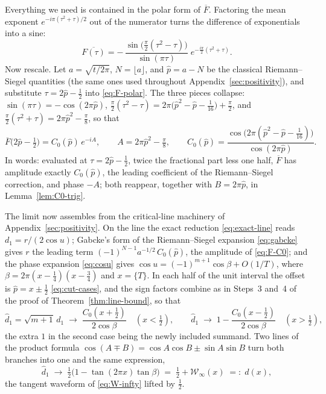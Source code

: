 \documentclass[11pt]{article}
\theoremstyle{definition}
\begin{document}
Everything we need is contained in the polar form of $\overline F$.
Factoring the
mean exponent $e^{-i\pi(\tau^{2}+\tau)/2}$ out of the numerator turns
the difference of exponentials into a sine:
\begin{equation}\label{eq:F-polar}
\overline{F(\tau)}
=-\,\frac{\sin\!\bigl(\tfrac{\pi}{2}(\tau^{2}-\tau)\bigr)}{\sin(\pi\tau)}\;
e^{-\tfrac{i\pi}{2}(\tau^{2}+\tau)} .
\end{equation}
Now rescale. Let $a=\sqrt{t/2\pi}$, $N=\lfloor a\rfloor$, and
$\hat p=a-N$ be the classical Riemann--Siegel quantities (the same ones
used throughout Appendix~\ref{sec:positivity}), and substitute
$\tau=2\hat p-\tfrac12$ into \eqref{eq:F-polar}. The three pieces
collapse: $\sin(\pi\tau)=-\cos(2\pi\hat p)$,
$\tfrac{\pi}{2}(\tau^{2}-\tau)=2\pi\bigl(\hat p^{2}-\hat p-\tfrac1{16}\bigr)
+\tfrac{\pi}{2}$, and
$\tfrac{\pi}{2}(\tau^{2}+\tau)=2\pi\hat p^{2}-\tfrac{\pi}{8}$, so that
\begin{equation}\label{eq:F-C0}
\overline{F}\bigl(2\hat p-\tfrac12\bigr)
= C_0(\hat p)\,e^{-iA},
\qquad
A=2\pi\hat p^{2}-\tfrac\pi8,
\qquad
C_0(\hat p)=\frac{\cos\!\bigl(2\pi(\hat p^{2}-\hat p-\tfrac1{16})\bigr)}
{\cos(2\pi\hat p)} .
\end{equation}
In words: evaluated at $\tau=2\hat p-\tfrac12$, twice the fractional
part less one half, $\overline F$ has amplitude exactly $C_0(\hat p)$, the
leading coefficient of the Riemann--Siegel correction, and phase $-A$;
both reappear, together with $B=2\pi\hat p$, in
Lemma~\ref{lem:C0-trig}.

The limit now assembles from the critical-line machinery of
Appendix~\ref{sec:positivity}. On the line the exact reduction
\eqref{eq:exact-line} reads $d_1=r/(2\cos u)$; Gabcke's form of the
Riemann--Siegel expansion \eqref{eq:gabcke} gives $r$ the leading term
$(-1)^{N-1}a^{-1/2}\,C_0(\hat p)$, the amplitude of \eqref{eq:F-C0}; and
the phase expansion \eqref{eq:cosu} gives
$\cos u=(-1)^{m+1}\cos\beta+O(1/T)$, where
$\beta=2\pi(x-\tfrac14)(x-\tfrac34)$ and $x=\{T\}$. In each half of the
unit interval the offset is $\hat p=x\pm\tfrac12$ \eqref{eq:cut-cases},
and the sign factors combine as in Steps~3 and~4 of the proof of
Theorem~\ref{thm:line-bound}, so that
\[
\hat d_1=\sqrt{m+1}\,d_1
\;\longrightarrow\;
\frac{C_0(x+\tfrac12)}{2\cos\beta}
\quad(x<\tfrac12),
\qquad
\hat d_1
\;\longrightarrow\;
1-\frac{C_0(x-\tfrac12)}{2\cos\beta}
\quad(x>\tfrac12),
\]
the extra $1$ in the second case being the newly included summand. Two
lines of the product formula
$\cos(A\mp B)=\cos A\cos B\pm\sin A\sin B$ turn both branches into one and
the same expression,
\[
\hat d_1
\;\longrightarrow\;
\tfrac12\bigl(1-\tan(2\pi x)\tan\beta\bigr)
\;=\;\tfrac12+\mathcal W_{\infty}(x)
\;=:\;d(x),
\]
the tangent waveform of \eqref{eq:W-infty} lifted by $\tfrac12$.
\end{document}
